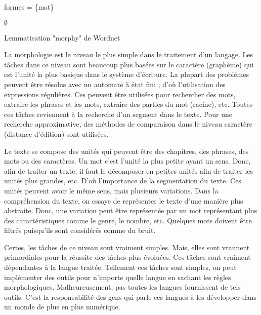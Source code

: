 \documentclass{KodeBook}
\begin{document}
\begin{algorithm}[H]
		
		
		formes = \{mot\}
		
		
		\Return $ \emptyset $\;
		
		\caption{Lemmatisation "morphy" de Wordnet \label{algo:morphy}}
		
	\end{algorithm}


\begin{discussion}
	La morphologie est le niveau le plus simple dans le traitement d'un langage. 
	Les tâches dans ce niveau sont beaucoup plus basées sur le caractère (graphème) qui est l'unité la plus basique dans le système d'écriture.  
	La plupart des problèmes peuvent être résolus avec un automate à état fini ; d'où l'utilisation des expressions régulières. 
	Ces peuvent être utilisées pour rechercher des mots, extraire les phrases et les mots, extraire des parties du mot (racine), etc. 
	Toutes ces tâches reviennent à la recherche d'un segment dans le texte. 
	Pour une recherche approximative, des méthodes de comparaison dans le niveau caractère (distance d'édition) sont utilisées. 
	
	Le texte se compose des unités qui peuvent être des chapitres, des phrases, des mots ou des caractères.
	Un mot c'est l'unité la plus petite ayant un sens. 
	Donc, afin de traiter un texte, il faut le décomposer en petites unités  afin de traiter les unités plus grandes, etc. 
	D'où l'importance de la segmentation du texte. 
	Ces unités peuvent avoir le même sens, mais plusieurs variations. 
	Dans la compréhension du texte, on essaye de représenter le texte d'une manière plus abstraite.
	Donc, une variation peut être représentée par un mot représentant plus des caractéristiques comme le genre, le nombre, etc. 
	Quelques mots doivent être filtrés puisqu'ils sont considérés comme du bruit.
	
	Certes, les tâches de ce niveau sont vraiment simples. 
	Mais, elles sont vraiment primordiales pour la réussite des tâches plus évoluées. 
	Ces tâches sont vraiment dépendantes à la langue traitée.
	Tellement ces tâches sont simples, on peut implémenter des outils pour n'importe quelle langue en sachant les règles morphologiques. 
	Malheureusement, pas toutes les langues fournissent de tels outils.  
	C'est la responsabilité des gens qui parle ces langues à les développer dans un monde de plus en plus numérique.
	
\end{discussion}

\ifx\wholebook\relax\else
% 
% 
	
\end{document}
